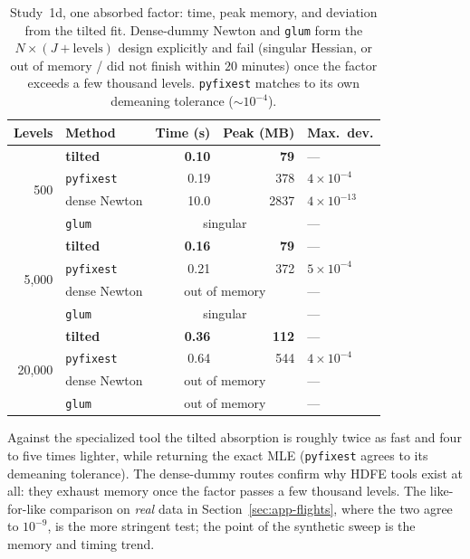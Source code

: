 \documentclass[11pt]{article}
\begin{document}
\begin{table}[t]
\centering
\caption{Study~1d, one absorbed factor: time, peak memory, and deviation
from the tilted fit.  Dense-dummy Newton and \texttt{glum} form the
$N \times (J + \text{levels})$ design explicitly and fail (singular
Hessian, or out of memory / did not finish within $20$ minutes) once the
factor exceeds a few thousand levels.  \texttt{pyfixest} matches to its
own demeaning tolerance ($\sim\!10^{-4}$).}
\label{tab:sim1d}
\small
\begin{tabular}{rlrrl}
\toprule
Levels & Method & Time (s) & Peak (MB) & Max.\ dev. \\
\midrule
\multirow{4}{*}{500}
 & \textbf{tilted}     & \textbf{0.10} & \textbf{79}  & --- \\
 & \texttt{pyfixest}   & 0.19 & 378  & $4\times10^{-4}$ \\
 & dense Newton        & 10.0 & 2837 & $4\times10^{-13}$ \\
 & \texttt{glum}       & \multicolumn{2}{c}{singular} & --- \\
\midrule
\multirow{4}{*}{5{,}000}
 & \textbf{tilted}     & \textbf{0.16} & \textbf{79}  & --- \\
 & \texttt{pyfixest}   & 0.21 & 372  & $5\times10^{-4}$ \\
 & dense Newton        & \multicolumn{2}{c}{out of memory} & --- \\
 & \texttt{glum}       & \multicolumn{2}{c}{singular} & --- \\
\midrule
\multirow{4}{*}{20{,}000}
 & \textbf{tilted}     & \textbf{0.36} & \textbf{112} & --- \\
 & \texttt{pyfixest}   & 0.64 & 544  & $4\times10^{-4}$ \\
 & dense Newton        & \multicolumn{2}{c}{out of memory} & --- \\
 & \texttt{glum}       & \multicolumn{2}{c}{out of memory} & --- \\
\bottomrule
\end{tabular}
\end{table}

Against the specialized tool the tilted absorption is roughly twice as
fast and four to five times lighter, while returning the exact MLE
(\texttt{pyfixest} agrees to its demeaning tolerance).  The dense-dummy
routes confirm why HDFE tools exist at all: they exhaust memory once the
factor passes a few thousand levels.  The like-for-like comparison on
\emph{real} data in Section~\ref{sec:app-flights}, where the two agree to
$10^{-9}$, is the more stringent test; the point of the synthetic sweep
is the memory and timing trend.
\end{document}
